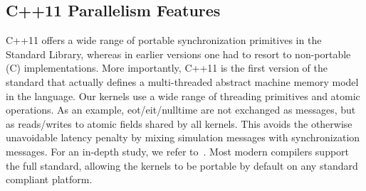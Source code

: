 \subsection{C++11 Parallelism Features}
C++11 offers a wide range of portable synchronization primitives in the Standard Library, whereas in earlier versions one had to resort to non-portable (C) implementations. More importantly, C++11 is the first version of the standard that actually defines a multi-threaded abstract machine memory model in the language.
Our kernels use a wide range of threading primitives and atomic operations. As an example, eot/eit/nulltime are not exchanged as messages, but as reads/writes to atomic fields shared by all kernels. This avoids the otherwise unavoidable latency penalty by mixing simulation messages with synchronization messages. For an in-depth study, we refer to~\cite{CPE:CPE3007}.
Most modern compilers support the full standard, allowing the kernels to be portable by default on any standard compliant platform. 
